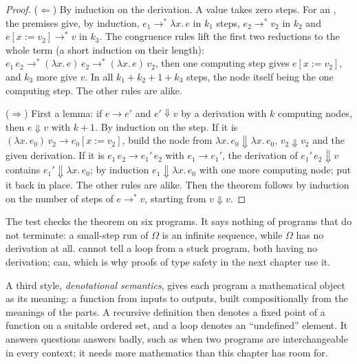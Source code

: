 \begin{proof}
($\Leftarrow$) By induction on the derivation. A value takes zero steps. For an , the premises give, by induction, $e_1 \to^* \lambda x.\,e$ in $k_1$ steps, $e_2 \to^* v_2$ in $k_2$ and $e[x := v_2] \to^* v$ in $k_3$. The congruence rules lift the first two reductions to the whole term (a short induction on their length): $e_1\,e_2 \to^* (\lambda x.\,e)\,e_2 \to^* (\lambda x.\,e)\,v_2$, then one computing step gives $e[x := v_2]$, and $k_3$ more give $v$. In all $k_1 + k_2 + 1 + k_3$ steps, the node itself being the one computing step. The other rules are alike.

($\Rightarrow$) First a lemma: if $e \to e'$ and $e' \Downarrow v$ by a derivation with $k$ computing nodes, then $e \Downarrow v$ with $k + 1$. By induction on the step. If it is $(\lambda x.\,e_0)\,v_2 \to e_0[x := v_2]$, build the  node from $\lambda x.\,e_0 \Downarrow \lambda x.\,e_0$, $v_2 \Downarrow v_2$ and the given derivation. If it is $e_1\,e_2 \to e_1'\,e_2$ with $e_1 \to e_1'$, the derivation of $e_1'\,e_2 \Downarrow v$ contains $e_1' \Downarrow \lambda x.\,e_0$; by induction $e_1 \Downarrow \lambda x.\,e_0$ with one more computing node; put it back in place. The other rules are alike. Then the theorem follows by induction on the number of steps of $e \to^* v$, starting from $v \Downarrow v$.
\end{proof}

The test  checks the theorem on six programs. It says nothing of programs that do not terminate: a small-step run of $\Omega$ is an infinite sequence, while $\Omega$ has no derivation at all.  cannot tell a loop from a stuck program, both having no derivation;  can, which is why proofs of type safety in the next chapter use it.

\begin{remark}
A third style, \emph{denotational semantics}, gives each program a mathematical object as its meaning: a function from inputs to outputs, built compositionally from the meanings of the parts. A recursive definition then denotes a fixed point of a function on a suitable ordered set, and a loop denotes an ``undefined'' element. It answers questions  answers badly, such as when two programs are interchangeable in every context; it needs more mathematics than this chapter has room for.
\end{remark}

